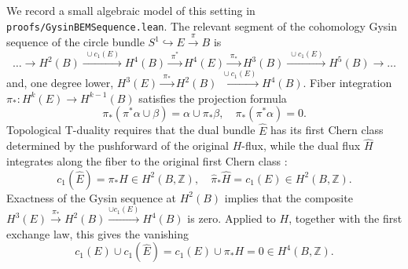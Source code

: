 \documentclass[11pt,a4paper]{article}
\begin{document}
We record a small algebraic model of this setting in \texttt{proofs/GysinBEMSequence.lean}. The relevant segment of the cohomology Gysin sequence of the circle bundle $S^1 \hookrightarrow E \xrightarrow{\pi} B$ is
\begin{equation}
\label{eq:gysin_sequence}
\dots \longrightarrow H^2(B) \xrightarrow{\; \cup c_1(E) \;} H^4(B) \xrightarrow{\; \pi^* \;} H^4(E) \xrightarrow{\; \pi_* \;} H^3(B) \xrightarrow{\; \cup c_1(E) \;} H^5(B) \longrightarrow \dots
\end{equation}
and, one degree lower, $H^3(E) \xrightarrow{\;\pi_*\;} H^2(B) \xrightarrow{\;\cup c_1(E)\;} H^4(B)$. Fiber integration $\pi_*: H^k(E) \to H^{k-1}(B)$ satisfies the projection formula
\begin{equation}
\pi_*(\pi^* \alpha \cup \beta) = \alpha \cup \pi_* \beta, \quad \pi_*(\pi^* \alpha) = 0 .
\end{equation}
Topological T-duality requires that the dual bundle $\widehat{E}$ has its first Chern class determined by the pushforward of the original $H$-flux, while the dual flux $\widehat{H}$ integrates along the fiber to the original first Chern class \cite{bouwknegt2004}:
\begin{equation}
c_1(\widehat{E}) = \pi_* H \in H^2(B, \mathbb{Z}), \quad \hat{\pi}_* \widehat{H} = c_1(E) \in H^2(B, \mathbb{Z}) .
\end{equation}
Exactness of the Gysin sequence at $H^2(B)$ implies that the composite $H^3(E) \xrightarrow{\pi_*} H^2(B) \xrightarrow{\cup c_1(E)} H^4(B)$ is zero. Applied to $H$, together with the first exchange law, this gives the vanishing
\begin{equation}
c_1(E) \cup c_1(\widehat{E}) = c_1(E) \cup \pi_* H = 0 \in H^4(B, \mathbb{Z}) .
\end{equation}
\end{document}
